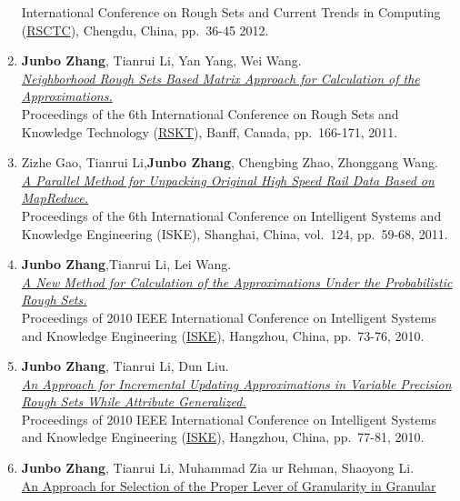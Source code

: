 \documentclass[]{article}
\begin{document}
\begin{enumerate}
  International Conference on Rough Sets and Current Trends in Computing
  (\href{http://www.informatik.uni-trier.de/~ley/db/conf/rsctc/index.html}{RSCTC}),
  Chengdu, China, pp.~36-45 2012.
\item
  \textbf{Junbo Zhang}, Tianrui Li, Yan Yang, Wei Wang.\\
  \href{http://dx.doi.org/10.1007/978-3-642-24425-4_23}{\emph{Neighborhood
  Rough Sets Based Matrix Approach for Calculation of the
  Approximations.}}\\ Proceedings of the 6th International Conference on
  Rough Sets and Knowledge Technology
  (\href{http://rskt.cs.uregina.ca}{RSKT}), Banff, Canada, pp.~166-171,
  2011.
\item
  Zizhe Gao, Tianrui Li,\textbf{Junbo Zhang}, Chengbing Zhao, Zhonggang
  Wang.\\ \href{http://dx.doi.org/10.1007/978-3-642-25658-5_8}{\emph{A
  Parallel Method for Unpacking Original High Speed Rail Data Based on
  MapReduce.}}\\ Proceedings of the 6th International Conference on
  Intelligent Systems and Knowledge Engineering (ISKE), Shanghai, China,
  vol.~124, pp.~59-68, 2011.
\item
  \textbf{Junbo Zhang},Tianrui Li, Lei Wang.\\
  \href{http://dx.doi.org/10.1109/ISKE.2010.5680797}{\emph{A New Method
  for Calculation of the Approximations Under the Probabilistic Rough
  Sets.}}\\ Proceedings of 2010 IEEE International Conference on
  Intelligent Systems and Knowledge Engineering
  (\href{http://ieeexplore.ieee.org/xpl/mostRecentIssue.jsp?punumber=5676709}{ISKE}),
  Hangzhou, China, pp.~73-76, 2010.
\item
  \textbf{Junbo Zhang}, Tianrui Li, Dun Liu.\\
  \href{http://dx.doi.org/10.1109/ISKE.2010.5680798}{\emph{An Approach
  for Incremental Updating Approximations in Variable Precision Rough
  Sets While Attribute Generalized.}}\\ Proceedings of 2010 IEEE
  International Conference on Intelligent Systems and Knowledge
  Engineering
  (\href{http://ieeexplore.ieee.org/xpl/mostRecentIssue.jsp?punumber=5676709}{ISKE}),
  Hangzhou, China, pp.~77-81, 2010.
\item
  \textbf{Junbo Zhang}, Tianrui Li, Muhammad Zia ur Rehman, Shaoyong
  Li.\\ \href{http://dx.doi.org/10.1142/9789814324700_0116}{An Approach
  for Selection of the Proper Lever of Granularity in Granular
}
\end{enumerate}
\end{document}
